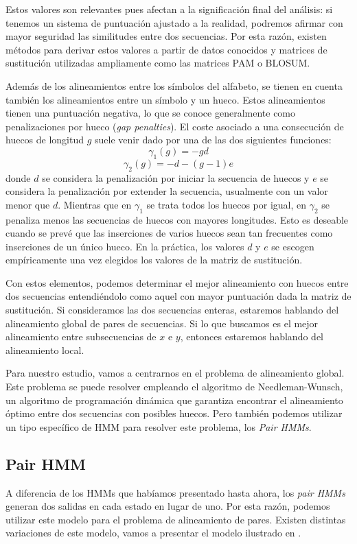 Estos valores son relevantes pues afectan a la significación final del análisis: si tenemos un sistema de puntuación ajustado a la realidad, podremos afirmar con mayor seguridad las similitudes entre dos secuencias. Por esta razón, existen métodos para derivar estos valores a partir de datos conocidos y matrices de sustitución utilizadas ampliamente como las matrices PAM o BLOSUM.

Además de los alineamientos entre los símbolos del alfabeto, se tienen en cuenta también los alineamientos entre un símbolo y un hueco. Estos alineamientos tienen una puntuación negativa, lo que se conoce generalmente como penalizaciones por hueco (\textit{gap penalties}). El coste asociado a una consecución de huecos de longitud $g$ suele venir dado por una de las dos siguientes funciones:
\[\gamma_1(g)=-gd \]
\[\gamma_2(g)=-d-(g-1)e\]
donde $d$ se considera la penalización por iniciar la secuencia de huecos y $e$ se considera la penalización por extender la secuencia, usualmente con un valor menor que $d$. Mientras que en $\gamma_1$ se trata todos los huecos por igual, en $\gamma_2$ se penaliza menos las secuencias de huecos con mayores longitudes. Esto es deseable cuando se prevé que las inserciones de varios huecos sean tan frecuentes como inserciones de un único hueco. En la práctica, los valores $d$ y $e$ se escogen empíricamente una vez elegidos los valores de la matriz de sustitución.

Con estos elementos, podemos determinar el mejor alineamiento con huecos entre dos secuencias entendiéndolo como aquel con mayor puntuación dada la matriz de sustitución. Si consideramos las dos secuencias enteras, estaremos hablando del alineamiento global de pares de secuencias. Si lo que buscamos es el mejor alineamiento entre subsecuencias de $x$ e $y$, entonces estaremos hablando del alineamiento local.

Para nuestro estudio, vamos a centrarnos en el problema de alineamiento global. Este problema se puede resolver empleando el algoritmo de Needleman-Wunsch, un algoritmo de programación dinámica que garantiza encontrar el alineamiento óptimo entre dos secuencias con posibles huecos. Pero también podemos utilizar un tipo específico de HMM para resolver este problema, los \textit{Pair HMMs}.

\subsection{Pair HMM}
A diferencia de los HMMs que habíamos presentado hasta ahora, los \textit{pair HMMs} generan dos salidas en cada estado en lugar de uno. Por esta razón, podemos utilizar este modelo para el problema de alineamiento de pares. Existen distintas variaciones de este modelo, vamos a presentar el modelo ilustrado en \cite{Durbin}. 

